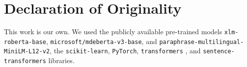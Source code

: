 \documentclass{article}
\theoremstyle{plain}
\theoremstyle{definition}
\theoremstyle{remark}
\begin{document}
\section*{Declaration of Originality}
This work is our own. We used the publicly available pre-trained
models \texttt{xlm-roberta-base}, \texttt{microsoft/mdeberta-v3-base},
and \texttt{paraphrase-multilingual-MiniLM-L12-v2}, the
\texttt{scikit-learn}, \texttt{PyTorch}, \texttt{transformers}
\citep{wolf2020transformers}, and \texttt{sentence-transformers}
libraries.



\end{document}
